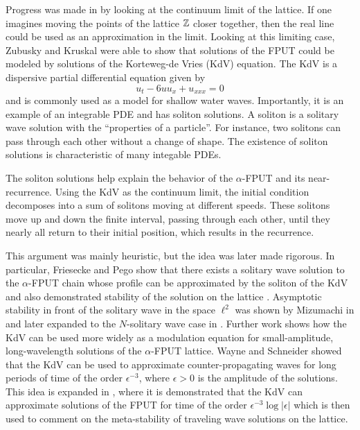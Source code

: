 Progress was made in  \cite{zabusky1965interaction} by looking at the continuum limit of the lattice. If one imagines moving the points of the lattice \(\mathbb{Z}\) closer together, then the real line could be used as an approximation in the limit. Looking at this limiting case, Zubusky and Kruskal were able to show that solutions of the FPUT could be modeled by solutions of the Korteweg-de Vries (KdV) equation. The KdV is a dispersive partial differential equation given by 
\begin{equation}\label{kdv}
	u_t  - 6 u u_x  + u_{xxx}= 0
\end{equation}
and is commonly used as a model for shallow water waves. Importantly, it is an example of an integrable PDE and has soliton solutions. A soliton is a solitary wave solution with the ``properties of a particle''. For instance, two solitons can pass through each other without a change of shape. The existence of soliton solutions is characteristic of many integable PDEs.

The soliton solutions help explain the behavior of the \(\alpha\)-FPUT and its near-recurrence. Using the KdV as the continuum limit, the initial condition decomposes into a sum of solitons moving at different speeds. These solitons move up and down the finite interval, passing through each other, until they nearly all return to their initial position, which results in the recurrence. 

This argument was mainly heuristic, but the idea was later made rigorous. In particular, Friesecke and Pego show that there exists a solitary wave solution to the \(\alpha\)-FPUT chain whose profile can be approximated by the soliton of the KdV and also demonstrated stability of the solution on the lattice \cite{friesecke1999solitary,friesecke2002solitary,friesecke2003solitary,friesecke2004solitary}. Asymptotic stability in front of the solitary wave in the space \(\ell^2\) was shown by Mizumachi in \cite{mizumachi2009asymptotic} and later expanded to the \(N\)-solitary wave case in \cite{mizumachi2013asymptotic}. Further work shows how the KdV can be used more widely as a modulation equation for small-amplitude, long-wavelength solutions of the \(\alpha\)-FPUT lattice. Wayne and Schneider showed that the KdV can be used to approximate counter-propagating waves for long periods of time \cite{schneider2000counter} of the order \(\epsilon^{-3}\), where \(\epsilon > 0\) is the amplitude of the solutions. This idea is expanded in \cite{khan2017long}, where it is demonstrated that the KdV can approximate solutions of the FPUT for time of the order \(\epsilon^{-3}\log |\epsilon|\) which is then used to comment on the meta-stability of traveling wave solutions on the lattice. 

